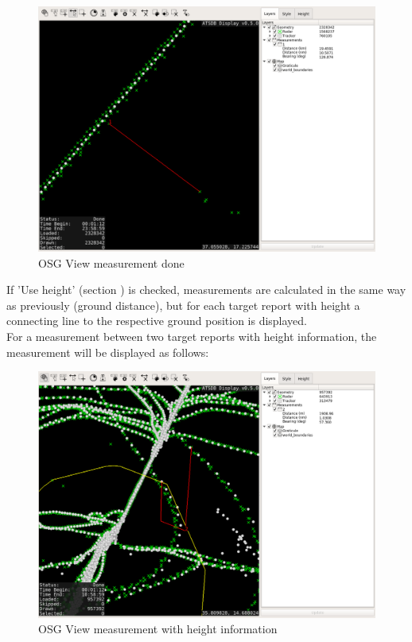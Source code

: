 \begin{figure}[H]
    \hspace*{-2.5cm}
    \includegraphics[width=19cm,frame]{figures/osgview_measure2.png}
  \caption{OSG View measurement done}
\end{figure}

If 'Use height' (section ) is checked, measurements are calculated in the same way as previously (ground distance), but for each target report with height a connecting line to the respective ground position is displayed. \\

For a measurement between two target reports with height information, the measurement will be displayed as follows:

\begin{figure}[H]
    \hspace*{-2.5cm}
    \includegraphics[width=19cm,frame]{figures/osgview_measure3d.png}
  \caption{OSG View measurement with height information}
\end{figure}

